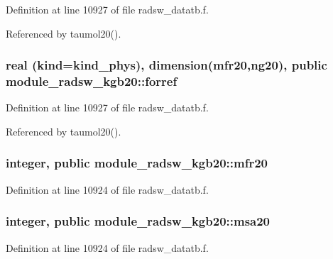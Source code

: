 Definition at line 10927 of file radsw\+\_\+datatb.\+f.



Referenced by taumol20().

\subsubsection[{\texorpdfstring{forref}{forref}}]{\setlength{\rightskip}{0pt plus 5cm}real (kind=kind\+\_\+phys), dimension({\bf mfr20},ng20), public module\+\_\+radsw\+\_\+kgb20\+::forref}\hypertarget{namespacemodule__radsw__kgb20_a3a660a7564064ca9997af9f95a5293b9}{}\label{namespacemodule__radsw__kgb20_a3a660a7564064ca9997af9f95a5293b9}


Definition at line 10927 of file radsw\+\_\+datatb.\+f.



Referenced by taumol20().

\subsubsection[{\texorpdfstring{mfr20}{mfr20}}]{\setlength{\rightskip}{0pt plus 5cm}integer, public module\+\_\+radsw\+\_\+kgb20\+::mfr20}\hypertarget{namespacemodule__radsw__kgb20_a9c7964eeb3acb4a11757fce977b73022}{}\label{namespacemodule__radsw__kgb20_a9c7964eeb3acb4a11757fce977b73022}


Definition at line 10924 of file radsw\+\_\+datatb.\+f.

\subsubsection[{\texorpdfstring{msa20}{msa20}}]{\setlength{\rightskip}{0pt plus 5cm}integer, public module\+\_\+radsw\+\_\+kgb20\+::msa20}\hypertarget{namespacemodule__radsw__kgb20_aadf199a3d453192a891b575d9adf8608}{}\label{namespacemodule__radsw__kgb20_aadf199a3d453192a891b575d9adf8608}


Definition at line 10924 of file radsw\+\_\+datatb.\+f.

